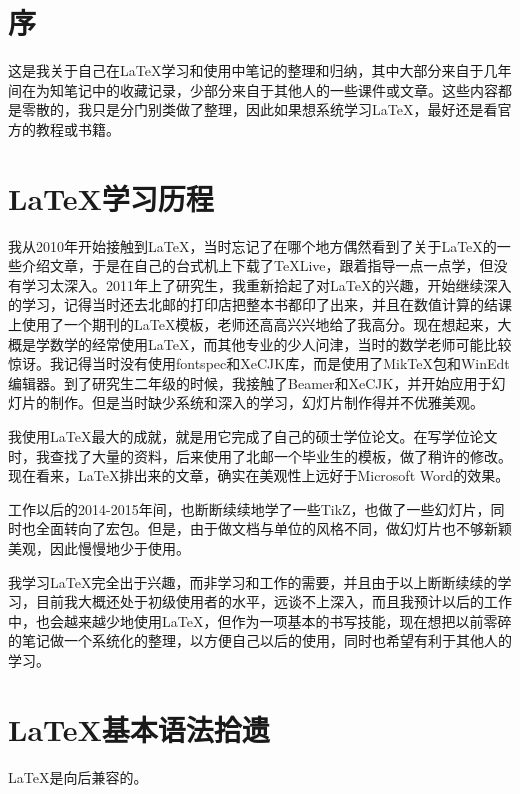 \documentclass[11pt]{ctexart}
\title{\heiti{\LaTeX 总结}}
\author{\kaishu{北方以北}}
\begin{document}
\maketitle

\tableofcontents

\section{序}

这是我关于自己在\LaTeX 学习和使用中笔记的整理和归纳，其中大部分来自于几年间在为知笔记中的收藏记录，少部分来自于其他人的一些课件或文章。这些内容都是零散的，我只是分门别类做了整理，因此如果想系统学习\LaTeX ，最好还是看官方的教程或书籍。

\section{\LaTeX 学习历程}

我从2010年开始接触到\LaTeX ，当时忘记了在哪个地方偶然看到了关于\LaTeX 的一些介绍文章，于是在自己的台式机上下载了\TeX Live，跟着指导一点一点学，但没有学习太深入。2011年上了研究生，我重新拾起了对\LaTeX 的兴趣，开始继续深入的学习，记得当时还去北邮的打印店把整本书都印了出来，并且在数值计算的结课上使用了一个期刊的\LaTeX 模板，老师还高高兴兴地给了我高分。现在想起来，大概是学数学的经常使用\LaTeX ，而其他专业的少人问津，当时的数学老师可能比较惊讶。我记得当时没有使用fontspec和XeCJK库，而是使用了MikTeX包和WinEdt编辑器。到了研究生二年级的时候，我接触了Beamer和XeCJK，并开始应用于幻灯片的制作。但是当时缺少系统和深入的学习，幻灯片制作得并不优雅美观。

我使用\LaTeX 最大的成就，就是用它完成了自己的硕士学位论文。在写学位论文时，我查找了大量的资料，后来使用了北邮一个毕业生的模板，做了稍许的修改。现在看来，\LaTeX 排出来的文章，确实在美观性上远好于Microsoft Word的效果。

工作以后的2014-2015年间，也断断续续地学了一些TikZ，也做了一些幻灯片，同时也全面转向了\CTeX 宏包。但是，由于做文档与单位的风格不同，做幻灯片也不够新颖美观，因此慢慢地少于使用。


我学习\LaTeX 完全出于兴趣，而非学习和工作的需要，并且由于以上断断续续的学习，目前我大概还处于初级使用者的水平，远谈不上深入，而且我预计以后的工作中，也会越来越少地使用\LaTeX ，但作为一项基本的书写技能，现在想把以前零碎的笔记做一个系统化的整理，以方便自己以后的使用，同时也希望有利于其他人的学习。

\section{\LaTeX 基本语法拾遗}
\LaTeX 是向后兼容的。
\end{document}
